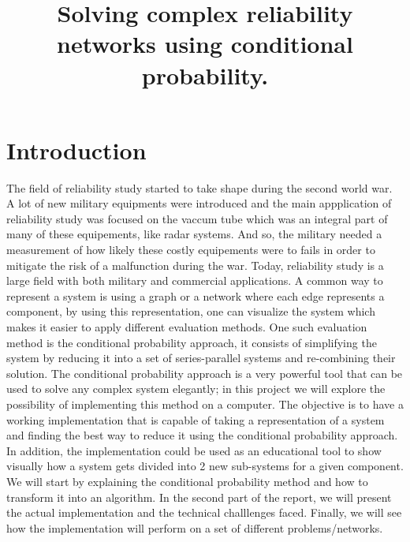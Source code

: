 \documentclass[conference]{IEEEtran}
\begin{document}
\title{Solving complex reliability networks using conditional probability.}

\author{
}

\maketitle

\begin{abstract}

\end{abstract}

\section{Introduction}
The field of reliability study started to take shape during the second world
war. A lot of new military equipments were introduced and the main appplication
of reliability study was focused on the vaccum tube which was an integral part of many
of these equipements, like radar systems. And so, the military needed a
measurement of how likely these costly equipements were to fails in order to
mitigate the risk of a malfunction during the war. Today, reliability study
is a large field with both military and commercial applications. A common way to
represent a system is using a graph or a network where each edge represents a
component, by using this representation, one can visualize the system which
makes it easier to apply different evaluation methods. One such evaluation
method is the conditional probability approach, it consists of simplifying the
system by reducing it into a set of series-parallel systems and re-combining
their solution. The conditional probability approach is a very powerful tool
that can be used to solve any complex system elegantly; in this project we will
explore the possibility of implementing this method on a computer. The objective
is to have a working implementation that is capable of taking a representation
of a system and finding the best way to reduce it using the conditional probability
approach. In addition, the implementation could be used as an educational tool
to show visually how a system gets divided into 2 new sub-systems for a given
component. We will start by explaining the conditional probability
method and how to transform it into an algorithm. In the second part of the
report, we will present the actual implementation and the technical challlenges
faced. Finally, we will see how the implementation will perform on a set of
different problems/networks.\\
\end{document}

